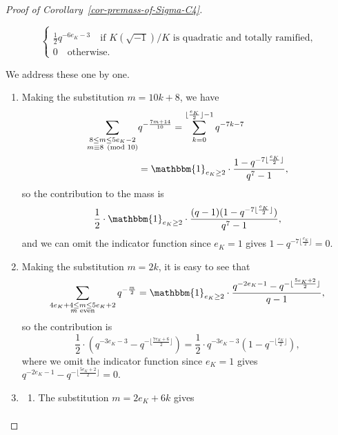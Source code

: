 \documentclass[11pt]{amsart}
\theoremstyle{theorem}
\theoremstyle{example}
\theoremstyle{definition}
\numberwithin{theorem}{section}
\numberwithin{theorem}{section}
\begin{document}
\begin{proof}[Proof of Corollary~\ref{cor-premass-of-Sigma-C4}]
\begin{enumerate}
$$\begin{cases}
            \\
            \frac{1}{2}q^{-6e_K-3}\quad\text{if $K(\sqrt{-1})/K$ is quadratic and totally ramified},
            \\
            0 \quad\text{otherwise}. 
        \end{cases}
    $$
    \end{enumerate}
    We address these one by one.
    \begin{enumerate}
        \item Making the substitution $m = 10k + 8$, we have 
            \begin{align*}
            \sum_{\substack{8 \leq m \leq 5e_K - 2 \\ m \equiv 8\pmod{10}}} & q^{-\frac{7m + 14}{10}} = \sum_{k=0}^{\lfloor \frac{e_K}{2}\rfloor - 1} q^{-7k - 7}
            \\
            &= \mathbbm{1}_{e_K \geq 2} \cdot \frac{1 - q^{- 7 \lfloor \frac{e_K}{2}\rfloor}}{q^7-1},
            \end{align*}
            so the contribution to the mass is 
            $$
            \frac{1}{2}\cdot \mathbbm{1}_{e_K \geq 2} \cdot \frac{(q-1)(1 - q^{-7\lfloor \frac{e_K}{2}\rfloor})}{q^7 - 1},
            $$
            and we can omit the indicator function since $e_K = 1$ gives $1 - q^{-7\lfloor\frac{e_K}{2}\rfloor}=0$.
        \item Making the substitution $m = 2k$, it is easy to see that 
            $$
            \sum_{\substack{
                    4e_K + 4 \leq m \leq 5e_K + 2
                    \\
                    \text{$m$ even}
                }} q^{-\frac{m}{2}} = \mathbbm{1}_{e_K \geq 2} \cdot \frac{q^{
                    -2e_K - 1
                } - q^{
                    - \lfloor \frac{5e_K + 2}{2}\rfloor
                }}{q-1},
            $$
            so the contribution is 
            $$
            \frac{1}{2} \cdot(q^{
                -3e_K - 3
            } - q^{
                - \lfloor \frac{7e_K + 6}{2}\rfloor
            }) = \frac{1}{2}\cdot q^{-3e_K - 3}(1 - q^{
                - \lfloor \frac{e_K}{2}\rfloor
            }),
            $$ 
            where we omit the indicator function since $e_K = 1$ gives $q^{-2e_K - 1} - q^{-\lfloor \frac{5e_K +2}{2}\rfloor} = 0$.
        \item \begin{enumerate}
            \item The substitution $m = 2e_K + 6k$ gives 
            \begin{align*}

\end{align*}
\end{enumerate}
\end{enumerate}
\end{proof}
\end{document}
